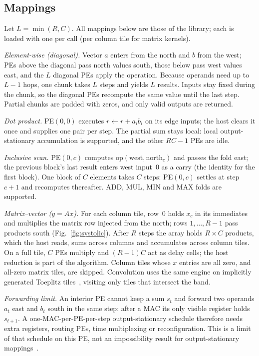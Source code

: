 \subsection{Mappings}
\label{sec:mappings}

Let $L=\min(R,C)$. All mappings below are those of the library; each is
loaded with one  per call (per column tile for matrix kernels).

\emph{Element-wise (diagonal).} Vector $a$ enters from the north and $b$
from the west; PEs above the diagonal pass north values south, those below
pass west values east, and the $L$ diagonal PEs apply the operation.
Because operands need up to $L-1$ hops, one chunk takes $L$ steps and yields
$L$ results. Inputs stay fixed during the chunk, so the diagonal PEs
recompute the same value until the last step. Partial chunks are padded with
zeros, and only valid outputs are returned.

\emph{Dot product.} PE$(0,0)$ executes $r\leftarrow r+a_ib_i$ on its edge
inputs; the host clears it once and supplies one pair per step. The partial
sum stays local: local output-stationary accumulation is supported, and the
other $RC-1$ PEs are idle.

\emph{Inclusive scan.} PE$(0,c)$ computes $\mathrm{op}(\mathrm{west},
\mathrm{north}_c)$ and passes the fold east; the previous block's last
result enters west input~0 as a carry (the identity for the first block).
One block of $C$ elements takes $C$ steps: PE$(0,c)$ settles at step $c+1$
and recomputes thereafter. ADD, MUL, MIN and MAX folds are supported.

\emph{Matrix--vector ($y=Ax$).} For each column tile, row~0 holds $x_c$ in
its immediates and multiplies the matrix row injected from the north;
rows $1,\dots,R-1$ pass products south (Fig.~\ref{fig:systolic}). After $R$
steps the array holds $R\times C$ products, which the host reads, sums
across columns and accumulates across column tiles. On a full tile, $C$ PEs
multiply and $(R-1)C$ act as delay cells; the host reduction is part of the
algorithm. Column tiles whose $x$ entries are all zero, and all-zero
matrix tiles, are skipped. Convolution uses the same engine on implicitly
generated Toeplitz tiles~\cite{golub-vanloan}, visiting only tiles that
intersect the band.



\emph{Forwarding limit.} An interior PE cannot keep a sum $s_t$ and forward
two operands $a_t$ east and $b_t$ south in the same step: after a MAC its
only visible register holds $s_{t+1}$. A one-MAC-per-PE-per-step
output-stationary schedule therefore needs extra registers, routing PEs,
time multiplexing or reconfiguration. This is a limit of that schedule on
this PE, not an impossibility result for output-stationary
mappings~\cite{sze-survey,eyeriss}.
